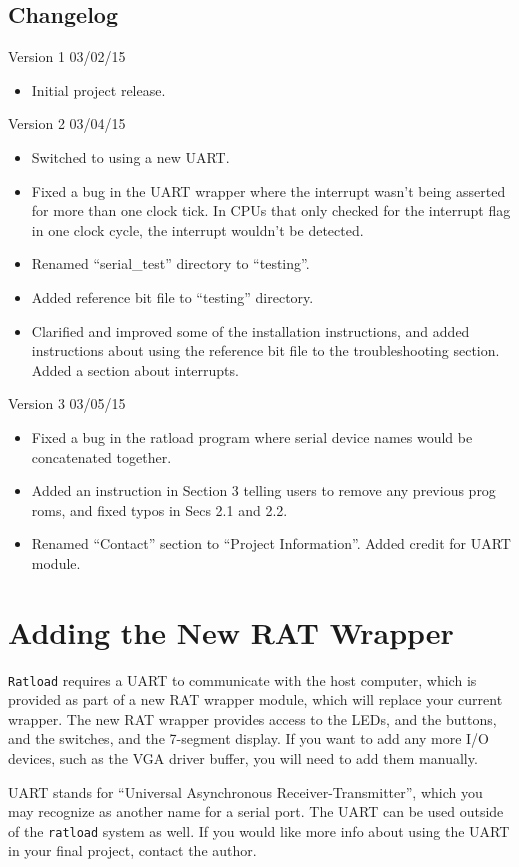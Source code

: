 \documentclass[notitlepage]{article}
\newcommand{\infosign}{\fontencoding{U}\fontfamily{futs}\huge\selectfont\char 116\relax}
\begin{document}
\subsection{Changelog}
Version 1 03/02/15
\begin{itemize}
  \item Initial project release.
\end{itemize}
Version 2 03/04/15
\begin{itemize}
\item Switched to using a new UART.
\item Fixed a bug in the UART wrapper where the interrupt wasn't being asserted for more than one clock tick. In CPUs that only checked for the interrupt flag in one clock cycle, the interrupt wouldn't be detected.
\item Renamed ``serial\_test'' directory to ``testing''.
\item Added reference bit file to ``testing'' directory.
\item Clarified and improved some of the installation instructions, and added instructions about using the reference bit file to the troubleshooting section. Added a section about interrupts.
\end{itemize}
Version 3 03/05/15
\begin{itemize}
\item Fixed a bug in the ratload program where serial device names would be concatenated together.
\item Added an instruction in Section 3 telling users to remove any previous prog roms, and fixed typos in Secs 2.1 and 2.2.
\item Renamed ``Contact'' section to ``Project Information''. Added credit for UART module.
\end{itemize}

\section{Adding the New RAT Wrapper}
\texttt{Ratload} requires a UART to communicate with the host computer, which is provided as part of a new RAT wrapper module, which will replace your current wrapper. The new RAT wrapper provides access to the LEDs, and the buttons, and the switches, and the 7-segment display. If you want to add any more I/O devices, such as the VGA driver buffer, you will need to add them manually.

\begin{infobox}
  {\infosign} UART stands for ``Universal Asynchronous Receiver-Transmitter'', which you may recognize as another name for a serial port. The UART can be used outside of the \texttt{ratload} system as well. If you would like more info about using the UART in your final project, contact the author.
\end{infobox}
\end{document}
